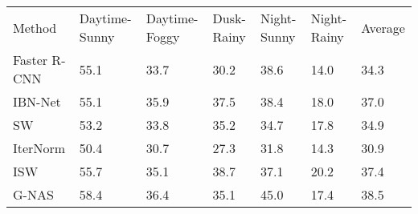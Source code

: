 \begin{table}[]
\begin{tabular}{lllllll}
Method       & Daytime-Sunny & Daytime-Foggy & Dusk-Rainy & Night-Sunny & Night-Rainy & Average \\
Faster R-CNN & 55.1          & 33.7          & 30.2       & 38.6        & 14.0        & 34.3    \\
IBN-Net      & 55.1          & 35.9          & 37.5       & 38.4        & 18.0        & 37.0    \\
SW           & 53.2          & 33.8          & 35.2       & 34.7        & 17.8        & 34.9    \\
IterNorm     & 50.4          & 30.7          & 27.3       & 31.8        & 14.3        & 30.9    \\
ISW          & 55.7          & 35.1          & 38.7       & 37.1        & 20.2        & 37.4    \\
G-NAS        & 58.4          & 36.4          & 35.1       & 45.0        & 17.4        & 38.5   
\end{tabular}
\end{table}